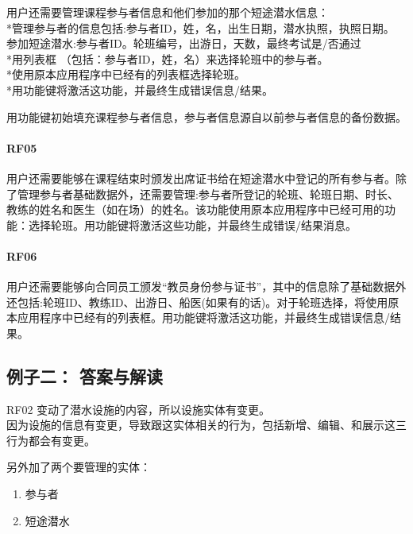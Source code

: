 用户还需要管理课程参与者信息和他们参加的那个短途潜水信息：\\
*管理参与者的信息包括:参与者ID，姓，名，出生日期，潜水执照，执照日期。\\
参加短途潜水:参与者ID。轮班编号，出游日，天数，最终考试是/否通过\\
*用列表框 （包括：参与者ID，姓，名）来选择轮班中的参与者。\\
*使用原本应用程序中已经有的列表框选择轮班。\\
*用功能键将激活这功能，并最终生成错误信息/结果。

用功能键初始填充课程参与者信息，参与者信息源自以前参与者信息的备份数据。

\hypertarget{rf05}{%
\paragraph{RF05}\label{rf05}}

用户还需要能够在课程结束时颁发出席证书给在短途潜水中登记的所有参与者。除了管理参与者基础数据外，还需要管理:参与者所登记的轮班、轮班日期、时长、教练的姓名和医生（如在场）的姓名。该功能使用原本应用程序中已经可用的功能：选择轮班。用功能键将激活这些功能，并最终生成错误/结果消息。

\hypertarget{rf06}{%
\paragraph{RF06}\label{rf06}}

用户还需要能够向合同员工颁发``教员身份参与证书''，其中的信息除了基础数据外还包括:轮班ID、教练ID、出游日、船医(如果有的话)。对于轮班选择，将使用原本应用程序中已经有的列表框。用功能键将激活这功能，并最终生成错误信息/结果。

\hypertarget{ux4f8bux5b50ux4e8c-ux7b54ux6848ux4e0eux89e3ux8bfb}{%
\subsection{例子二：
答案与解读}\label{ux4f8bux5b50ux4e8c-ux7b54ux6848ux4e0eux89e3ux8bfb}}

RF02 变动了潜水设施的内容，所以设施实体有变更。\\
因为设施的信息有变更，导致跟这实体相关的行为，包括新增、编辑、和展示这三行为都会有变更。

另外加了两个要管理的实体：

\begin{enumerate}
\tightlist
\item
  参与者
\item
  短途潜水
\end{enumerate}

